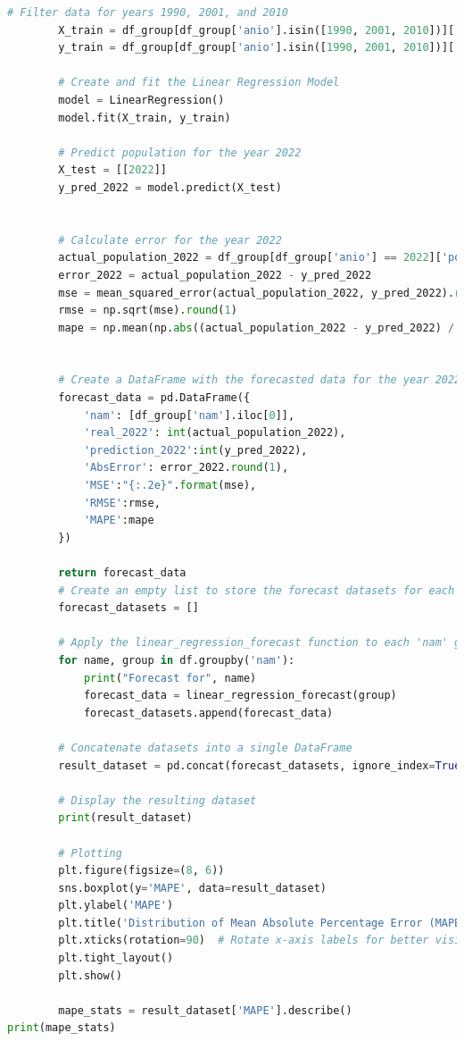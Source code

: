 \documentclass{article}
\theoremstyle{mytheoremstyle}
\theoremstyle{mytheoremstyle}
\theoremstyle{myproblemstyle}
\begin{document}
\begin{lstlisting}[language=Python, caption= Regresion Lineal.ipynb,label={lst:LR.ipynb}]
        # Filter data for years 1990, 2001, and 2010
        X_train = df_group[df_group['anio'].isin([1990, 2001, 2010])]['anio'].values.reshape(-1, 1)
        y_train = df_group[df_group['anio'].isin([1990, 2001, 2010])]['pob'].values
    
        # Create and fit the Linear Regression Model
        model = LinearRegression()
        model.fit(X_train, y_train)
    
        # Predict population for the year 2022
        X_test = [[2022]]
        y_pred_2022 = model.predict(X_test)
        
    
        # Calculate error for the year 2022
        actual_population_2022 = df_group[df_group['anio'] == 2022]['pob'].values
        error_2022 = actual_population_2022 - y_pred_2022
        mse = mean_squared_error(actual_population_2022, y_pred_2022).round(1)
        rmse = np.sqrt(mse).round(1)
        mape = np.mean(np.abs((actual_population_2022 - y_pred_2022) / actual_population_2022)).round(4) * 100
    
    
        # Create a DataFrame with the forecasted data for the year 2022 and error
        forecast_data = pd.DataFrame({
            'nam': [df_group['nam'].iloc[0]],
            'real_2022': int(actual_population_2022),
            'prediction_2022':int(y_pred_2022),
            'AbsError': error_2022.round(1),
            'MSE':"{:.2e}".format(mse),
            'RMSE':rmse,
            'MAPE':mape
        })
    
        return forecast_data
        # Create an empty list to store the forecast datasets for each 'nam' group
        forecast_datasets = []
        
        # Apply the linear_regression_forecast function to each 'nam' group
        for name, group in df.groupby('nam'):
            print("Forecast for", name)
            forecast_data = linear_regression_forecast(group)
            forecast_datasets.append(forecast_data)
        
        # Concatenate datasets into a single DataFrame
        result_dataset = pd.concat(forecast_datasets, ignore_index=True)
        
        # Display the resulting dataset
        print(result_dataset)
        
        # Plotting
        plt.figure(figsize=(8, 6))
        sns.boxplot(y='MAPE', data=result_dataset)
        plt.ylabel('MAPE')
        plt.title('Distribution of Mean Absolute Percentage Error (MAPE) by nam')
        plt.xticks(rotation=90)  # Rotate x-axis labels for better visibility
        plt.tight_layout()
        plt.show()
        
        mape_stats = result_dataset['MAPE'].describe()
print(mape_stats)

  \end{lstlisting}
\end{document}
